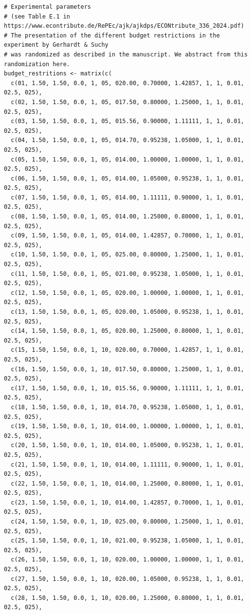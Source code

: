 \documentclass[11pt, a4paper, oneside]{article}
\theoremstyle{Plain}
\theoremstyle{Definition}
\theoremstyle{Remark}
\begin{document}
\begin{appendix}
\begin{lstlisting}
# Experimental parameters
# (see Table E.1 in https://www.econtribute.de/RePEc/ajk/ajkdps/ECONtribute_336_2024.pdf)
# The presentation of the different budget restrictions in the experiment by Gerhardt & Suchy
# was randomized as described in the manuscript. We abstract from this randomization here.
budget_restritions <- matrix(c(
  c(01, 1.50, 1.50, 0.0, 1, 05, 020.00, 0.70000, 1.42857, 1, 1, 0.01, 02.5, 025),
  c(02, 1.50, 1.50, 0.0, 1, 05, 017.50, 0.80000, 1.25000, 1, 1, 0.01, 02.5, 025),
  c(03, 1.50, 1.50, 0.0, 1, 05, 015.56, 0.90000, 1.11111, 1, 1, 0.01, 02.5, 025),
  c(04, 1.50, 1.50, 0.0, 1, 05, 014.70, 0.95238, 1.05000, 1, 1, 0.01, 02.5, 025),
  c(05, 1.50, 1.50, 0.0, 1, 05, 014.00, 1.00000, 1.00000, 1, 1, 0.01, 02.5, 025),
  c(06, 1.50, 1.50, 0.0, 1, 05, 014.00, 1.05000, 0.95238, 1, 1, 0.01, 02.5, 025),
  c(07, 1.50, 1.50, 0.0, 1, 05, 014.00, 1.11111, 0.90000, 1, 1, 0.01, 02.5, 025),
  c(08, 1.50, 1.50, 0.0, 1, 05, 014.00, 1.25000, 0.80000, 1, 1, 0.01, 02.5, 025),
  c(09, 1.50, 1.50, 0.0, 1, 05, 014.00, 1.42857, 0.70000, 1, 1, 0.01, 02.5, 025),
  c(10, 1.50, 1.50, 0.0, 1, 05, 025.00, 0.80000, 1.25000, 1, 1, 0.01, 02.5, 025),
  c(11, 1.50, 1.50, 0.0, 1, 05, 021.00, 0.95238, 1.05000, 1, 1, 0.01, 02.5, 025),
  c(12, 1.50, 1.50, 0.0, 1, 05, 020.00, 1.00000, 1.00000, 1, 1, 0.01, 02.5, 025),
  c(13, 1.50, 1.50, 0.0, 1, 05, 020.00, 1.05000, 0.95238, 1, 1, 0.01, 02.5, 025),
  c(14, 1.50, 1.50, 0.0, 1, 05, 020.00, 1.25000, 0.80000, 1, 1, 0.01, 02.5, 025),
  c(15, 1.50, 1.50, 0.0, 1, 10, 020.00, 0.70000, 1.42857, 1, 1, 0.01, 02.5, 025),
  c(16, 1.50, 1.50, 0.0, 1, 10, 017.50, 0.80000, 1.25000, 1, 1, 0.01, 02.5, 025),
  c(17, 1.50, 1.50, 0.0, 1, 10, 015.56, 0.90000, 1.11111, 1, 1, 0.01, 02.5, 025),
  c(18, 1.50, 1.50, 0.0, 1, 10, 014.70, 0.95238, 1.05000, 1, 1, 0.01, 02.5, 025),
  c(19, 1.50, 1.50, 0.0, 1, 10, 014.00, 1.00000, 1.00000, 1, 1, 0.01, 02.5, 025),
  c(20, 1.50, 1.50, 0.0, 1, 10, 014.00, 1.05000, 0.95238, 1, 1, 0.01, 02.5, 025),
  c(21, 1.50, 1.50, 0.0, 1, 10, 014.00, 1.11111, 0.90000, 1, 1, 0.01, 02.5, 025),
  c(22, 1.50, 1.50, 0.0, 1, 10, 014.00, 1.25000, 0.80000, 1, 1, 0.01, 02.5, 025),
  c(23, 1.50, 1.50, 0.0, 1, 10, 014.00, 1.42857, 0.70000, 1, 1, 0.01, 02.5, 025),
  c(24, 1.50, 1.50, 0.0, 1, 10, 025.00, 0.80000, 1.25000, 1, 1, 0.01, 02.5, 025),
  c(25, 1.50, 1.50, 0.0, 1, 10, 021.00, 0.95238, 1.05000, 1, 1, 0.01, 02.5, 025),
  c(26, 1.50, 1.50, 0.0, 1, 10, 020.00, 1.00000, 1.00000, 1, 1, 0.01, 02.5, 025),
  c(27, 1.50, 1.50, 0.0, 1, 10, 020.00, 1.05000, 0.95238, 1, 1, 0.01, 02.5, 025),
  c(28, 1.50, 1.50, 0.0, 1, 10, 020.00, 1.25000, 0.80000, 1, 1, 0.01, 02.5, 025),

\end{lstlisting}
\end{appendix}
\end{document}
